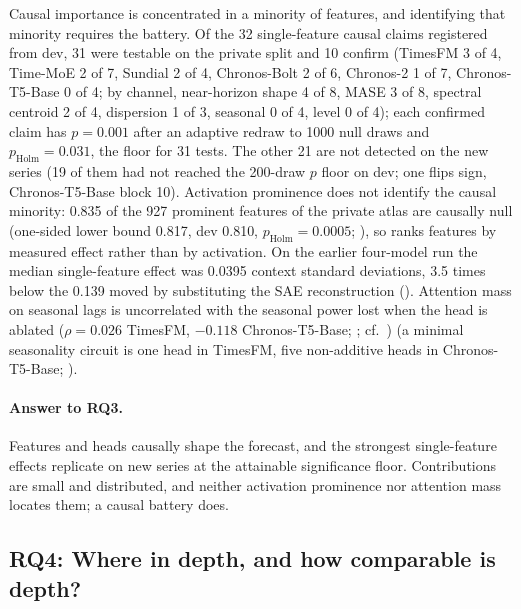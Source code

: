Causal importance is concentrated in a minority of features, and identifying that minority requires the battery.
Of the 32 single-feature causal claims registered from dev, 31 were testable on the private split and 10 confirm (TimesFM 3 of 4, Time-MoE 2 of 7, Sundial 2 of 4, Chronos-Bolt 2 of 6, Chronos-2 1 of 7,
Chronos-T5-Base 0 of 4; by channel, near-horizon shape 4 of 8, MASE 3 of 8, spectral centroid 2 of 4, dispersion 1 of 3,
seasonal 0 of 4, level 0 of 4); each confirmed claim has $p=0.001$ after an adaptive redraw to 1000 null draws and
$p_{\text{Holm}}=0.031$, the floor for 31 tests. The other 21 are not detected on the new series (19 of them
had not reached the 200-draw $p$ floor on dev; one flips sign, Chronos-T5-Base block 10). Activation prominence does not
identify the causal minority: 0.835 of the 927 prominent features of the private atlas are causally null (one-sided lower
bound 0.817, dev 0.810, $p_{\text{Holm}}=0.0005$; ), so \tool{} ranks features by measured effect rather than
by activation. On the earlier four-model run the median single-feature effect
was 0.0395 context standard deviations, 3.5 times below the 0.139 moved by substituting the SAE reconstruction
(). Attention
mass on seasonal lags is uncorrelated with the seasonal power lost when the head is ablated ($\rho=0.026$ TimesFM,
$-0.118$ Chronos-T5-Base; ; cf.\ \citealt{jain2019attention})
(a minimal seasonality circuit is one head in TimesFM, five non-additive heads in Chronos-T5-Base; ).

\paragraph{Answer to RQ3.} Features and heads causally shape the forecast, and the strongest single-feature effects
replicate on new series at the attainable significance floor. Contributions are small and distributed, and neither
activation prominence nor attention mass locates them; a causal battery does.

\subsection{RQ4: Where in depth, and how comparable is depth?}
\label{sec:rq4}

